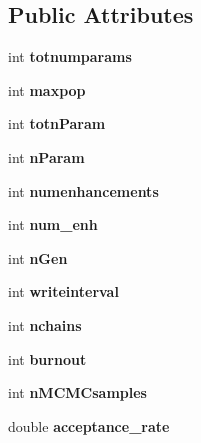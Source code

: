 \subsection*{Public Attributes}
\begin{DoxyCompactItemize}
\item 
\mbox{\label{class_c_g_a_ae4d6001283c51105ca20708e90686dbe}} 
int {\bfseries totnumparams}
\item 
\mbox{\label{class_c_g_a_a7b8c7fb1e3c42722851b77947bfd6d82}} 
int {\bfseries maxpop}
\item 
\mbox{\label{class_c_g_a_a120fe4bd0a4c214be307f09fa1028ff7}} 
int {\bfseries totn\+Param}
\item 
\mbox{\label{class_c_g_a_a2f5e05f9f56e32574459207c31209b0c}} 
int {\bfseries n\+Param}
\item 
\mbox{\label{class_c_g_a_ac98c97a03ffc44b01d35b107d8bb92b0}} 
int {\bfseries numenhancements}
\item 
\mbox{\label{class_c_g_a_a2225df63c8919b4dcbaf8e5fc62b0d99}} 
int {\bfseries num\+\_\+enh}
\item 
\mbox{\label{class_c_g_a_a9e3b169f09735365bf0f88227702a0c5}} 
int {\bfseries n\+Gen}
\item 
\mbox{\label{class_c_g_a_a46de291d089b32e2b539e2bed69eea4d}} 
int {\bfseries writeinterval}
\item 
\mbox{\label{class_c_g_a_ac131c027d17e18cd2e75c6dd74cca08e}} 
int {\bfseries nchains}
\item 
\mbox{\label{class_c_g_a_aec2dd7d3a860b0543c90afe0510dbfc6}} 
int {\bfseries burnout}
\item 
\mbox{\label{class_c_g_a_a69783d1b52f66752c1bdba0aa7c0ccad}} 
int {\bfseries n\+M\+C\+M\+Csamples}
\item 
\mbox{\label{class_c_g_a_a3e81126801c795f891b4bc96daecb797}} 
double {\bfseries acceptance\+\_\+rate}

\end{DoxyCompactItemize}
